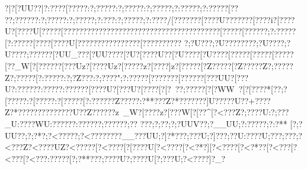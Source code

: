 {{{{{{{{{{{{{{{{{{{{{{{{{{{{{{{{{{{{{{{{{{{{{{{{{{{{{{{{{{{{{{{{{{{{{{{{{{{{{{{{{{{{{{{{{{{{{{{{{{{{{{{{{{{{{{{{{{{{{{{{{{{{{{{{{{{{{{{{{{{{{{{{{{{{{{{{{{{{{{{{{{{{{{{{{{{{{{{{{{{{{{{{{{{{{{{{{{{{{{{{{{{{{{{{{{{{{{{{{{{{{{{{{{{{{{{{{{{{{{{{{{{{{{{{{{{{{{{{{{{{{{{{{{{{{{{{{{{{{{{{{{{{{{{{{{{{{{{{{{{{{{{{{{{{{{{{{{{{{{{{{{{{{{{{{{{{{{{{{{{{{{{{{{{{{{{{{{{{{{{{{{{{{{{{{{{{{{{{{{{{{{{{{{{{{{{{{{{{{{{{{{{{{{{{{{{{{{{{{{{{{{{{{{{{{{{{{{{{{{{{{{{{{{{{{{{{{{{{{{{{{{{{{{{{{{{{{{{{{{{{{{{{{{{{{{{{{{{{{{{{{{{{{{{{{{{{{{{{{{{{{{{{{{{{{{{{{{{{{{{{{{{{{{{{{{{{{{{{{{{{{{{{{{{{{{{{{{{{{{{{{{{{{{{{{{{{{{{{{{{{{{{{{{{{{{{{{{{{{{{{{{{{{{{{{{{{{{{{{{{{{{{{{{{{{{{{{{{{{{{{{{{{{{{{{{{{{{{{{{{{{{{{{{{{{{{{{{{{{{{{{{{{{{{{{{{{{{{{{{{{{{{{{{{{{{{{{{{{{{{{{{{{{{{{{{{{{{{{{{{{{{{{{{{{{{{{{{{{{{{{{{{{{{{{{{{{{{{{{{{{{{{{{{{{{{{{{{{{{{{{{{{{{{{{{{{{{{{{{{{{{{{{{{{{{{{{{{{{{{{{{{{{{{{{{{{{{{{{{{{{{{{{{{{{{{{{{{{{{{{{{{{{{{{{{{{{{{{{{{{{{{{{{{{{{{{{{{{{{{{{{{{{{{{{{{{{{{{{{{{{{{{{{{{{{{{{{{{{{{{{{{{{{{{{{{{{{{{{{{{{{{{{{{{{{{{{{{{{{{{{{{{{{{{{{{{{{{{{{{{{{{{{{{{{{{{{{{{{{{{{{{{{{{{{{{{{{{{{{{{{{{{{{{{{{{{{{{{{{{{{{{{{{{{{{{{{{{{{{{{{{{{{{{{{{{{{{{{{{{{{{{{{{{{{{{{{{{{{{{{{{{{{{{{{{{{{{{{{{{{{{{{{{{{{{{{{{{{{{{{{{{{{{{{{{{{{{{{{{{{{{{{{{{{{{{{{{{{{{{{{{{{{{{{{{{{{{{{{{{{{{{{{{{{{{{{{{{{{{{{{{{{{{{{{{{{{{{{{{{{{{{{{{{{{{{{{{{{{{{{{{{{{{{{{{{{{{{{{{{{{{{{{{{{{{{{{{{{{{{{{{{{{{{{{{{{{{{{{{{{{{{{{{{{{{{{{{{{{{{{{{{{{{{{{{{{{{{{{{{{{{{{{{{{{{{{{{{{{{{{{{{{{{{{{{{{{{{{{{{{{{{{{{{{{{{{{{{{{{{{{{{{{{{{{{{{{{{{{{{{{{{{{{{{{{{{{{{{{{{{{{{{{{{{{{{{{{{{{{{{{{{{{{{{{{{{{{{{{{{{{{{{{{{{{{{{{{{{{{{{{{{{{{{{{{{{{{{{{{{{{{{{{{{{{{{{{{{{{{{{{{{{{{{{{{{{{{{{{{{{{{{{{{{{{{{{{{{{{{{{{{{?|?[?UU??|?:????[????? :?;?????:?;?????:?;?????;?:?????;?:?????[????;??????:?;?????:?;?????;?:???:?;?????;?:????/[???????[????U{???????[????i?[????U?[????U[????? [????? {??????{??????{??????{??????{??????{?????[????? [??????;?:?????[?:?????[????[????U[????? {??????{????? [????? {?????
{?;?U?? {?;?U?? {????? {?;?U?? ??;?U????;???? ??[?UU_???[?UU????[?U}?[???  ?U??[?U?? ??[?U???{?[???? {?[???? {?[????{?[?}?_W[?[?????{?[???Uz?[????Uz?[?????z?[????]z?[?????[?Z?????[?Z?????Z?;?????Z?;?????[?:?????:?;?Z???:?;????";?:?????[?{?????{?[?????{?[???UU{?[???}U{?:?????{?:? ???{?:?????{?[????U{?[???U{?[????[?[?~?  {?;?????[?[?WW~?[?[????*[?\??   ;?[?????:?[?????:?[?????[?:?????{?Z????{?:?**??{?Z?*????{???]U{?{????U{?{?+????Z? *???{???????????U??Z?  ????{?z~_W{?[? ???z?[???W[?[?  ?^[?<?  ??Z?;????U:?;???_U:????WU:??????:??????;??????;??
???;?;??;?;?UUV?{?;?__UU;?:?????;?:?**
 [?;?UU??;?;?* ?;?<?????;?<??????\???__?\???UU;?]?*???;?\? ??U;?]?  ??;?\?  ?U:?\????U;?\?  ??;?\?  ??;?<?  ??Z?<????UZ?<?????[?<? ???[?[????U[?<? ???[?<? *?][?<? ???[?<? *??[?<?  ??[?<?  ??[?<?  ??:?\?????[?;?**??{?;????U{?;????U[?;? ??U;?<????]?_? }}}}}}}}}}}}}}}}}}}}}}}}}}}}}}}}}}}}}}}}}}}}}}}}}}}}}}}}}}}}}}}}}}}}}}}}}}}}}}}}}}}}}}}}}}}}}}}}}}}}}}}}}}}}}}}}}}}}}}}}}}}}}}}}}}}}}}}}}}}}}}}}}}}}}}}}}}}}}}}}}}}}}}}}}}}}}}}}}}}}}}}}}}}}}}}}}}}}}}}}}}}}}}}}}}}}}}}}}}}}}}}}}}}}}}}}}}}}}}}}}}}}}}}}}}}}}}}}}}}}}}}}}}}}}}}}}}}}}}}}}}}}}}}}}}}}}}}}}}}}}}}}}}}}}}}}}}}}}}}}}}}}}}}}}}}}}}}}}}}}}}}}}}}}}}}}}}}}}}}}}}}}}}}}}}}}}}}}}}}}}}}}}}}}}}}}}}}}}}}}}}}}}}}}}}}}}}}}}}}}}}}}}}}}}}}}}}}}}}}}}}}}}}}}}}}}}}}}}}}}}}}}}}}}}}}}}}}}}}}}}}}}}}}}}}}}}}}}}}}}}}}}}}}}}}}}}}}}}}}}}}}}}}}}}}}}}}}}}}}}}}}}}}}}}}}}}}}}}}}}}}}}}}}}}}}}}}}}}}}}}}}}}}}}}}}}}}}}}}}}}}}}}}}}}}}}}}}}}}}}}}}}}}}}}}}}}}}}}}}}}}}}}}}}}}}}}}}}}}}}}}}}}}}}}}}}}}}}}}}}}}}}}}}}}}}}}}}}}}}}}}}}}}}}}}}}}}}}}}}}}}}}}}}}}}}}}}}}}}}}}}}}}}}}}}}}}}}}}}}}}}}}}}}}}}}}}}}}}}}}}}}}}}}}}}}}}}}}}}}}}}}}}}}}}}}}}}}}}}}}}}}}}}}}}}}}}}}}}}}}}}}}}}}}}}}}}}}}}}}}}}}}}}}}}}}}}}}}}}}}}}}}}}}}}}}}}}}}}}}}}}}}}}}}}}}}}}}}}}}}}}}}}}}}}}}}}}}}}}}}}}}}}}}}}}}}}}}}}}}}}}}}}}}}}}}}}}}}}}}}}}}}}}}}}}}}}}}}}}}}}}}}}}}}}}}}}}}}}}}}}}}}}}}}}}}}}}}}}}}}}}}}}}}}}}}}}}}}}}}}}}}}}}}}}}}}}}}}}}}}}}}}}}}}}}}}}}}}}}}}}}}}}}}}}}}}}}}}}}}}}}}}}}}}}}}}}}}}}}}}}}}}}}}}}}}}}}}}}}}}}}}}}}}}}}}}}}}}}}}}}}}}}}}}}}}}}}}}}}}}}}}}}}}}}}}}}}}}}}}}}}}}}}}}}}}}}}}}}}}}}}}}}}}}}}}}}}}}}}}}}}}}}}}}}}}}}}}}}}}}}}}}}}}}}}}}}}}}}}}}}}}}}}}}}}}}}}}}}}}}}}}}}}}}}}}}}}}}}}}}}}}}}}}}}}}}}}}}}}}}}}}}}}}}}}}}}}}}}}}}}}}}}}}}}}}}}}}}}}}}}}}}}}}}}}}}}}}}}}}}}}}}}}}}}}}}}}}}}}}}}}}}}}}}}}}}}}}}}}}}}}}}}}}}}}}}}}}}}}}}}}}}}}}}}}}}}}}}}}}}}}}}}}}}}}}}}}}}}}}}}}}}}}}}}}}}}}}}}}}}}}}}}}}}}}}}}}}}}}}}}}}}}}}}}}}}}}}}}}}}}}}}}}}}}}}}}}}}}}}}}}}}}}}}}}}}}}}}}}}}}}}}}}}}}}}}}}}}}}}}}}}}}}}}}}}}}}}}}}}}}}}}}}}}}}}}}}}}}}}}}}}}}}}}}}}}}}}}}}}}}}}

